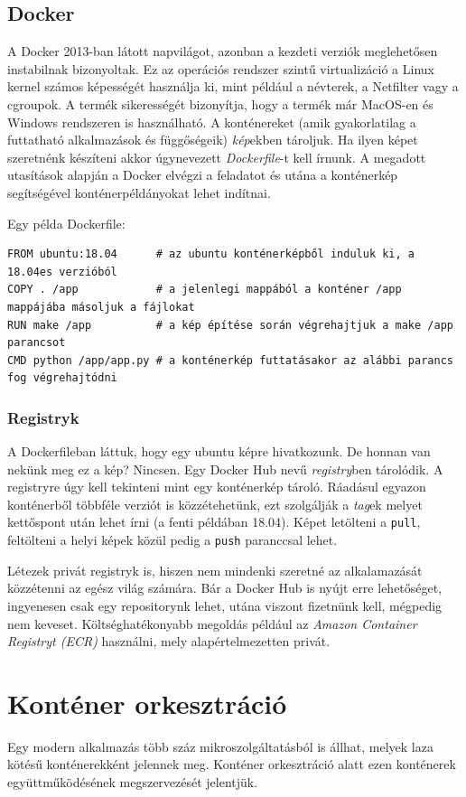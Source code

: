 \subsection{Docker}
A Docker 2013-ban látott napvilágot, azonban a kezdeti verziók meglehetősen instabilnak bizonyoltak. Ez az operációs rendszer szintű virtualizáció a Linux kernel számos képességét használja ki, mint például a névterek, a Netfilter vagy a cgroupok. A termék sikerességét bizonyítja, hogy a termék már MacOS-en és Windows rendszeren is használható.
A konténereket (amik gyakorlatilag a futtatható alkalmazások és függőségeik) \textit{kép}ekben tároljuk. Ha ilyen képet szeretnénk készíteni akkor úgynevezett \textit{Dockerfile}-t kell írnunk. A megadott utasítások alapján a Docker elvégzi a feladatot és utána a konténerkép segítségével konténerpéldányokat lehet indítnai.

Egy példa Dockerfile:
\begin{lstlisting}
FROM ubuntu:18.04      # az ubuntu konténerképből induluk ki, a 18.04es verzióból
COPY . /app            # a jelenlegi mappából a konténer /app mappájába másoljuk a fájlokat
RUN make /app          # a kép építése során végrehajtjuk a make /app parancsot
CMD python /app/app.py # a konténerkép futtatásakor az alábbi parancs fog végrehajtódni
\end{lstlisting}
\subsubsection{Registryk}
A Dockerfileban láttuk, hogy egy ubuntu képre hivatkozunk. De honnan van nekünk meg ez a kép? Nincsen. Egy Docker Hub nevű \textit{registry}ben tárolódik. A registryre úgy kell tekinteni mint egy konténerkép tároló. Ráadásul egyazon konténerből többféle verziót is közzétehetünk, ezt szolgálják a \textit{tag}ek melyet kettőspont után lehet írni (a fenti példában 18.04). Képet letölteni a \lstinline{pull}, feltölteni a helyi képek közül pedig a \lstinline{push} paranccsal lehet.

Létezek privát registryk is, hiszen nem mindenki szeretné az alkalamazását közzétenni az egész világ számára. Bár a Docker Hub is nyújt erre lehetőséget, ingyenesen csak egy repositorynk lehet, utána viszont fizetnünk kell, mégpedig nem keveset. Költséghatékonyabb megoldás például az \textit{Amazon Container Registryt (ECR)} használni, mely alapértelmezetten privát.
\section{Konténer orkesztráció}
Egy modern alkalmazás több száz mikroszolgáltatásból is állhat, melyek laza kötésű konténerekként jelennek meg. Konténer orkesztráció alatt ezen konténerek együttműködésének megszervezését jelentjük.\cite{ContOrch}

